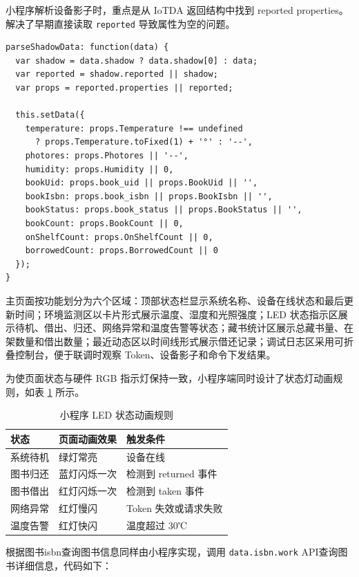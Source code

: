 \documentclass[12pt,hyperref,a4paper,UTF8]{ctexart}
\begin{document}
小程序解析设备影子时，重点是从 IoTDA 返回结构中找到 reported properties。解决了早期直接读取 \texttt{reported} 导致属性为空的问题。

\begin{lstlisting}
parseShadowData: function(data) {
  var shadow = data.shadow ? data.shadow[0] : data;
  var reported = shadow.reported || shadow;
  var props = reported.properties || reported;

  this.setData({
    temperature: props.Temperature !== undefined
      ? props.Temperature.toFixed(1) + '°' : '--',
    photores: props.Photores || '--',
    humidity: props.Humidity || 0,
    bookUid: props.book_uid || props.BookUid || '',
    bookIsbn: props.book_isbn || props.BookIsbn || '',
    bookStatus: props.book_status || props.BookStatus || '',
    bookCount: props.BookCount || 0,
    onShelfCount: props.OnShelfCount || 0,
    borrowedCount: props.BorrowedCount || 0
  });
}
\end{lstlisting}

主页面按功能划分为六个区域：顶部状态栏显示系统名称、设备在线状态和最后更新时间；环境监测区以卡片形式展示温度、湿度和光照强度；LED 状态指示区展示待机、借出、归还、网络异常和温度告警等状态；藏书统计区展示总藏书量、在架数量和借出数量；最近动态区以时间线形式展示借还记录；调试日志区采用可折叠控制台，便于联调时观察 Token、设备影子和命令下发结果。

为使页面状态与硬件 RGB 指示灯保持一致，小程序端同时设计了状态灯动画规则，如表 \ref{tab:mini_led} 所示。

\begin{table}[!htbp]
    \centering
    \begin{tabular}{l|l|l}
    \hline
        状态 & 页面动画效果 & 触发条件 \\
    \hline
        系统待机 & 绿灯常亮 & 设备在线 \\
        图书归还 & 蓝灯闪烁一次 & 检测到 returned 事件 \\
        图书借出 & 红灯闪烁一次 & 检测到 taken 事件 \\
        网络异常 & 红灯慢闪 & Token 失效或请求失败 \\
        温度告警 & 红灯快闪 & 温度超过 30℃ \\
    \hline
    \end{tabular}
    \caption{小程序 LED 状态动画规则}
    \label{tab:mini_led}
\end{table}

根据图书isbn查询图书信息同样由小程序实现，调用 \texttt{data.isbn.work} API查询图书详细信息，代码如下：
\end{document}
